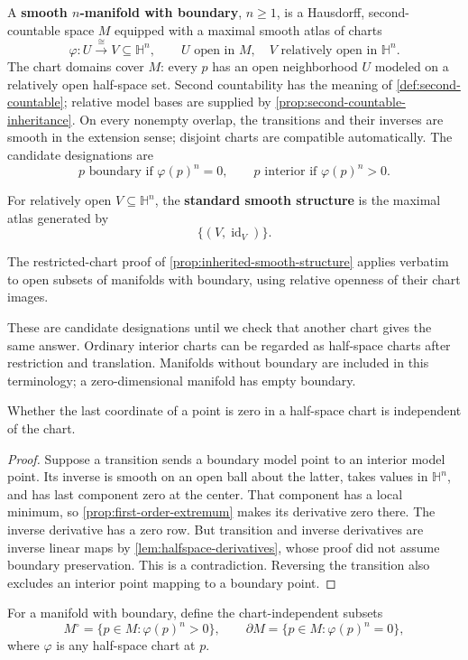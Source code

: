 \begin{definition}
A \textbf{smooth $n$-manifold with boundary}, $n\geq1$, is a Hausdorff,
second-countable space $M$ equipped with a maximal smooth atlas of charts
\[
\varphi:U\xrightarrow{\cong}V\subseteq\mathbb H^n,\qquad
U\text{ open in }M,\quad V\text{ relatively open in }\mathbb H^n.
\]
The chart domains cover $M$: every $p$ has an open neighborhood $U$
modeled on a relatively open half-space set. Second countability has the
meaning of \cref{def:second-countable}; relative model bases are supplied
by \cref{prop:second-countable-inheritance}.
On every nonempty overlap, the transitions
and their inverses are smooth in the extension sense; disjoint charts
are compatible automatically. The candidate designations are
\[
p\text{ boundary}\text{ if }\varphi(p)^n=0,\qquad
p\text{ interior}\text{ if }\varphi(p)^n>0.
\]
\end{definition}
\begin{definition}
For relatively open $V\subseteq\mathbb H^n$, the \textbf{standard smooth
structure} is the maximal atlas generated by
\[
\{(V,\operatorname{id}_V)\}.
\]
\end{definition}
The restricted-chart proof of
\cref{prop:inherited-smooth-structure} applies verbatim to open subsets of
manifolds with boundary, using relative openness of their chart images.

These are candidate designations until we check that another chart gives
the same answer. Ordinary interior charts can be regarded as half-space
charts after restriction and translation. Manifolds without boundary are
included in this terminology; a zero-dimensional manifold has empty boundary.

\begin{proposition}
\label{prop:boundary-chart-independence}
Whether the last coordinate of a point is zero in a half-space chart is
independent of the chart.
\end{proposition}
\begin{proof}
Suppose a transition sends a boundary model point to an interior model
point. Its inverse is smooth on an open ball about the latter, takes
values in $\mathbb H^n$, and has last component zero at the center.
That component has a local minimum, so \cref{prop:first-order-extremum}
makes its derivative zero there. The inverse derivative has a zero row.
But transition and inverse derivatives are inverse linear maps by
\cref{lem:halfspace-derivatives}, whose proof did not assume boundary
preservation. This is a contradiction. Reversing the transition also
excludes an interior point mapping to a boundary point.
\end{proof}
\begin{definition}
For a manifold with boundary, define the chart-independent subsets
\[
M^\circ=\{p\in M:\varphi(p)^n>0\},\qquad
\partial M=\{p\in M:\varphi(p)^n=0\},
\]
where $\varphi$ is any half-space chart at $p$.
\end{definition}

